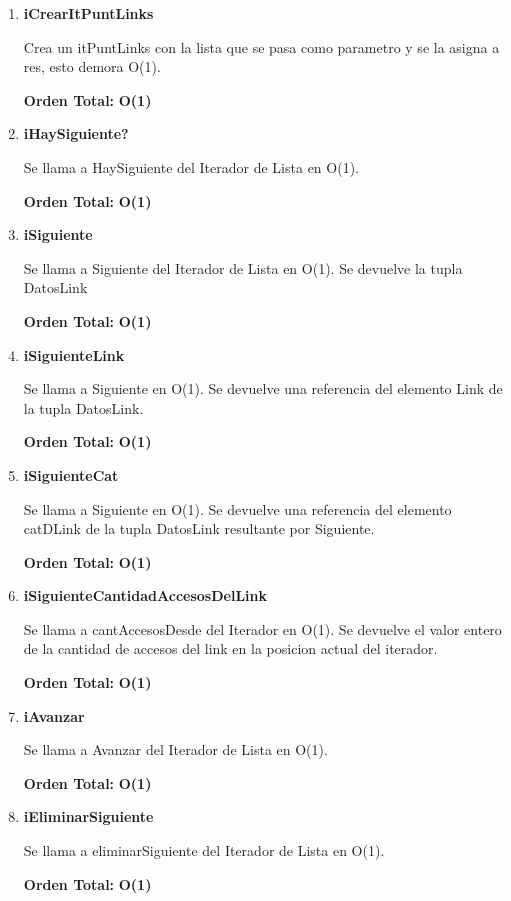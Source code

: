 \vspace*{1em}
\begin{enumerate}

\item\textbf{iCrearItPuntLinks}
\par Crea un itPuntLinks con la lista que se pasa como parametro y se la asigna a res, esto demora O(1).
\par \textbf{Orden Total:} \textbf{O(1)}

\item\textbf{iHaySiguiente?}
\par Se llama a HaySiguiente del Iterador de Lista en O(1).
\par \textbf{Orden Total:} \textbf{O(1)}

\item\textbf{iSiguiente}
\par Se llama a Siguiente del Iterador de Lista en O(1). Se devuelve la tupla DatosLink
\par \textbf{Orden Total:} \textbf{O(1)}

\item\textbf{iSiguienteLink}
\par Se llama a Siguiente en O(1). Se devuelve una referencia del elemento Link de la tupla DatosLink.
\par \textbf{Orden Total:} \textbf{O(1)}

\item\textbf{iSiguienteCat}
\par Se llama a Siguiente en O(1). Se devuelve una referencia del elemento catDLink de la tupla DatosLink resultante por Siguiente.
\par \textbf{Orden Total:} \textbf{O(1)}

\item\textbf{iSiguienteCantidadAccesosDelLink}
\par Se llama a cantAccesosDesde del Iterador en O(1). Se devuelve el valor entero de la cantidad de accesos del link en la posicion actual del iterador.
\par \textbf{Orden Total:} \textbf{O(1)}

\item\textbf{iAvanzar}
\par Se llama a Avanzar del Iterador de Lista en O(1).
\par \textbf{Orden Total:} \textbf{O(1)}

\item\textbf{iEliminarSiguiente}
\par Se llama a eliminarSiguiente del Iterador de Lista en O(1).
\par \textbf{Orden Total:} \textbf{O(1)}


\end{enumerate}

